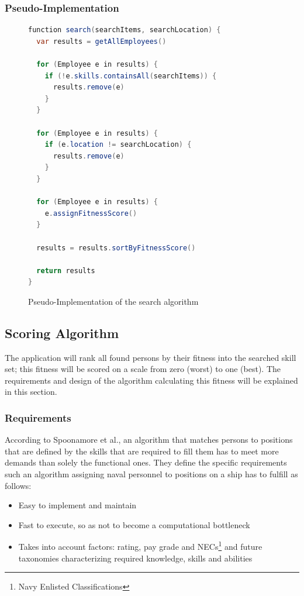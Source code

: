 \newpage

\subsubsection{Pseudo-Implementation}
\begin{figure}[!htp]
\begin{lstlisting}[language=Java]
function search(searchItems, searchLocation) {
  var results = getAllEmployees()

  for (Employee e in results) {
    if (!e.skills.containsAll(searchItems)) {
      results.remove(e)
    }
  }

  for (Employee e in results) {
    if (e.location != searchLocation) {
      results.remove(e)
    }
  }

  for (Employee e in results) {
    e.assignFitnessScore()
  }

  results = results.sortByFitnessScore()

  return results
}
\end{lstlisting}
\caption[Pseudocode: Search Algorithm]{Pseudo-Implementation of the search algorithm}
\end{figure}

\newpage

\subsection{Scoring Algorithm}
\label{fitscorealg}
The application will rank all found persons by their fitness into the searched skill set; this fitness will be scored on a scale from zero (worst) to one (best).
The requirements and design of the algorithm calculating this fitness will be explained in this section.

\subsubsection{Requirements}
According to Spoonamore et al., an algorithm that matches persons to positions that are defined by the skills that are required to fill them has to meet more demands than solely the functional ones. They define the specific requirements such an algorithm assigning naval personnel to positions on a ship has to fulfill as follows:
\begin{framed}
\begin{itemize}
  \item Easy to implement and maintain
  \item Fast to execute, so as not to become a computational bottleneck
  \item Takes into account factors: rating, pay grade and NECs\footnote{Navy Enlisted Classifications} and future taxonomies characterizing required knowledge, skills and abilities
\end{itemize}
\cite[P. 14]{USN}
\end{framed}


